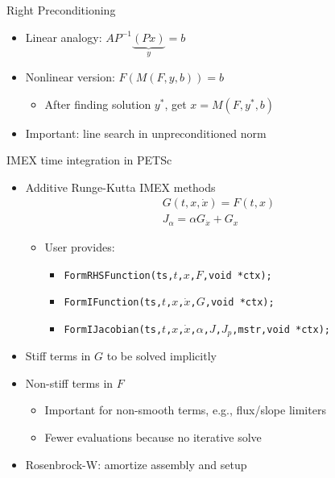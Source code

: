 \documentclass{beamer}
\begin{document}
\begin{frame}{Right Preconditioning}
  \begin{itemize}
  \item Linear analogy: $A P^{-1} \underbrace{(P x)}_y = b$
  \item Nonlinear version: $F(M(F,y,b)) = b$
    \begin{itemize}
    \item After finding solution $y^*$, get $x = M(F,y^*,b)$
    \end{itemize}
  \item Important: line search in unpreconditioned norm
  \end{itemize}
\end{frame}



\begin{frame}{IMEX time integration in PETSc}
  \begin{itemize}
  \item Additive Runge-Kutta IMEX methods
    \begin{gather*}
      G(t,x,\dot x) = F(t,x) \\
      J_\alpha = \alpha G_{\dot x} + G_x
    \end{gather*}
    \vspace{-1em}
    \begin{itemize}
    \item User provides:
      \begin{itemize}
      \item \texttt{FormRHSFunction(ts,$t$,$x$,$F$,void *ctx);}
      \item \texttt{FormIFunction(ts,$t$,$x$,$\dot x$,$G$,void *ctx);}
      \item \texttt{FormIJacobian(ts,$t$,$x$,$\dot x$,$\alpha$,$J$,$J_{p}$,mstr,void *ctx);}
      \end{itemize}
    \end{itemize}
  \item Stiff terms in $G$ to be solved implicitly
  \item Non-stiff terms in $F$
    \begin{itemize}
    \item Important for non-smooth terms, e.g., flux/slope limiters
    \item Fewer evaluations because no iterative solve
    \end{itemize}
  \item Rosenbrock-W: amortize assembly and setup
  \end{itemize}
\end{frame}
\end{document}
